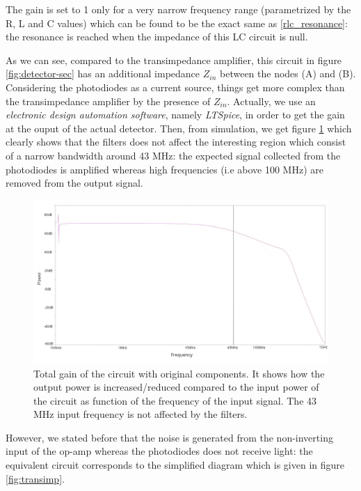 \documentclass[11pt]{report}
\begin{document}
The gain is set to 1 only for a very narrow frequency range (parametrized by the R, L and C values) which can be found to be the exact same as \eqref{rlc_resonance}: the resonance is reached when the impedance of this LC circuit is null.

As we can see, compared to the transimpedance amplifier, this circuit in figure \ref{fig:detector-sec} has an additional impedance $Z_{in}$ between the nodes (A) and (B). Considering the photodiodes as a current source, things get more complex than the transimpedance amplifier by the presence of $Z_{in}$. Actually, we use an \textit{electronic design automation software}, namely \textit{LTSpice}, in order to get the gain at the ouput of the actual detector. Then, from simulation, we get figure \ref{fig:total_gain_original} which clearly shows that the filters does not affect the interesting region which consist of a narrow bandwidth around 43 MHz: the expected signal collected from the photodiodes is amplified whereas high frequencies (i.e above 100 MHz) are removed from the output signal.

\begin{figure}[h!]
\centering
\includegraphics[width=\textwidth]{total_gain_original}
\caption{Total gain of the circuit with original components. It shows how the output power is increased/reduced compared to the input power of the circuit as function of the frequency of the input signal. The 43 MHz input frequency is not affected by the filters.}
\label{fig:total_gain_original}
\end{figure}

However, we stated before that the noise is generated from the non-inverting input of the op-amp whereas the photodiodes does not receive light: the equivalent circuit corresponds to the simplified diagram which is given in figure \ref{fig:transimp}.
\end{document}
